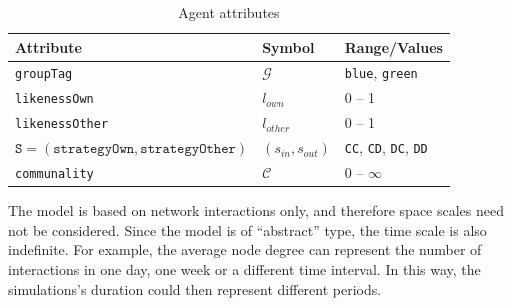\begin{table}[t!] \centering
	\small
	\begin{tabular}{lll}
		\hline
		\textbf{Attribute} & \textbf{Symbol} & \textbf{Range/Values}  \\
		\hline
		\rule{0pt}{0ex} \texttt{groupTag} & $ \mathcal{G} $ & {\texttt{blue}, \texttt{green}}  \\
		\rule{0pt}{4ex} \texttt{likenessOwn}   &   $ l_{own} $   &  0 -- 1    \\
		\rule{0pt}{4ex} \texttt{likenessOther}   &   $ l_{other} $   &  0 -- 1    \\
		\rule{0pt}{4ex} $ \texttt{S} = (\texttt{strategyOwn}, \texttt{strategyOther}) $ &$ (s_{in},s_{out}) $ & {\texttt{CC}, \texttt{CD}, \texttt{DC}, \texttt{DD}} \\
		\rule{0pt}{4ex} \texttt{communality} & $ \mathcal{C} $ & 0 -- $ \infty $\\
		\hline
	\end{tabular}
	\caption{Agent attributes}
	\label{tab:AgentAttributes}
\end{table}

The model is based on network interactions only, and therefore space scales need not be considered. Since the model is of ``abstract'' type, the time scale is also indefinite. For example, the average node degree can represent the number of interactions in one day, one week or a different time interval. In this way, the simulations's duration could then represent different periods.

